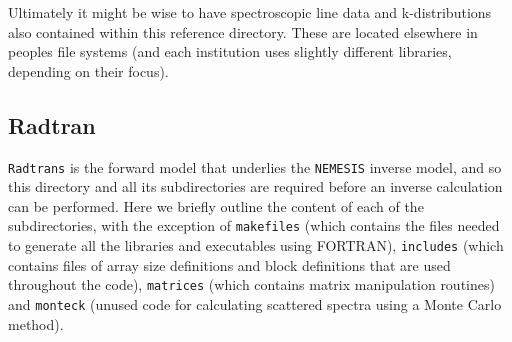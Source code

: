 \documentclass[final,5p,times,twocolumn,authoryear]{elsarticle}
\begin{document}
Ultimately it might be wise to have spectroscopic line data and k-distributions also contained within this reference directory.  These are located elsewhere in peoples file systems (and each institution uses slightly different libraries, depending on their focus).  

\subsection{Radtran}

\verb#Radtrans# is the forward model that underlies the \verb#NEMESIS# inverse model, and so this directory and all its subdirectories are required before an inverse calculation can be performed.  Here we briefly outline the content of each of the subdirectories, with the exception of \verb#makefiles# (which contains the files needed to generate all the libraries and executables using FORTRAN), \verb#includes# (which contains files of array size definitions and block definitions that are used throughout the code), \verb#matrices# (which contains matrix manipulation routines) and \verb#monteck# (unused code for calculating scattered spectra using a Monte Carlo method). 
\end{document}
